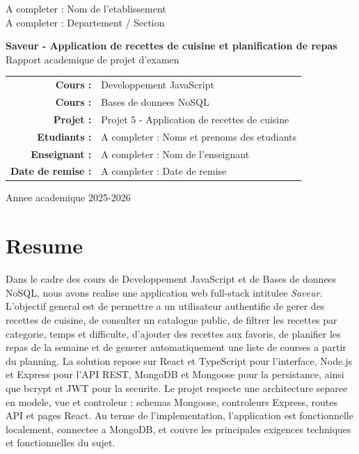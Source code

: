 \documentclass[12pt,a4paper]{report}
\newcommand{\projecttitle}{Saveur - Application de recettes de cuisine et planification de repas}
\newcommand{\studentnames}{A completer : Noms et prenoms des etudiants}
\newcommand{\institution}{A completer : Nom de l'etablissement}
\newcommand{\department}{A completer : Departement / Section}
\newcommand{\teacher}{A completer : Nom de l'enseignant}
\newcommand{\submissiondate}{A completer : Date de remise}
\begin{document}
\begin{titlepage}
  \centering
  \vspace*{1cm}
  {\Large \institution\\}
  {\large \department\\[1.5cm]}

  {\Huge\bfseries \projecttitle\\[0.8cm]}
  {\Large Rapport academique de projet d'examen\\[1.2cm]}

  \begin{tabular}{rl}
    \textbf{Cours :} & Developpement JavaScript\\
    \textbf{Cours :} & Bases de donnees NoSQL\\
    \textbf{Projet :} & Projet 5 - Application de recettes de cuisine\\
    \textbf{Etudiants :} & \studentnames\\
    \textbf{Enseignant :} & \teacher\\
    \textbf{Date de remise :} & \submissiondate\\
  \end{tabular}

  \vfill
  {\large Annee academique 2025-2026\\}
\end{titlepage}

\chapter*{Resume}

Dans le cadre des cours de Developpement JavaScript et de Bases de donnees NoSQL, nous avons realise une application web full-stack intitulee \textit{Saveur}. L'objectif general est de permettre a un utilisateur authentifie de gerer des recettes de cuisine, de consulter un catalogue public, de filtrer les recettes par categorie, temps et difficulte, d'ajouter des recettes aux favoris, de planifier les repas de la semaine et de generer automatiquement une liste de courses a partir du planning. La solution repose sur React et TypeScript pour l'interface, Node.js et Express pour l'API REST, MongoDB et Mongoose pour la persistance, ainsi que bcrypt et JWT pour la securite. Le projet respecte une architecture separee en modele, vue et controleur : schemas Mongoose, controleurs Express, routes API et pages React. Au terme de l'implementation, l'application est fonctionnelle localement, connectee a MongoDB, et couvre les principales exigences techniques et fonctionnelles du sujet.
\end{document}

